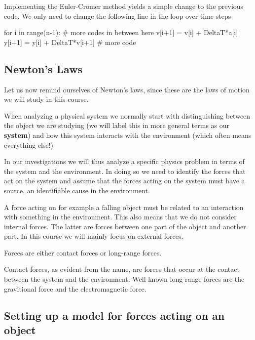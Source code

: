 \documentclass[%
oneside,                 %
final,                   %
10pt]{article}
\begin{document}
Implementing the Euler-Cromer method yields a simple change to the previous code. We only need to change the following line in the loop over time
steps






\bpycod
for i in range(n-1):
    # more codes in between here
    v[i+1] = v[i] + DeltaT*a[i]
    y[i+1] = y[i] + DeltaT*v[i+1]
    # more code

\epycod


\subsection{Newton's Laws}

Let us now remind ourselves of Newton's laws, since these are the laws of motion we will study in this course.

When analyzing a physical system we normally start with distinguishing between the object we are studying (we will label this in more general terms as our \textbf{system}) and how this system interacts with the environment (which often means everything else!)

In our investigations we will thus analyze a specific physics problem in terms of the system and the environment.
In doing so we need to identify the forces that act on the system and assume that the
forces acting on the system must have a source, an identifiable cause in
the environment.

A force acting on for example a falling object must be related to an interaction with something in the environment.
This also means that we do not consider internal forces. The latter are forces between
one part of the object and another part. In this course we will mainly focus on external forces.

Forces are either contact forces or long-range forces.

Contact forces, as evident from the name, are forces that occur at the contact between
the system and the environment. Well-known long-range forces are the gravitional force and the electromagnetic force.

\subsection{Setting up a model for forces acting on an object}
\end{document}
